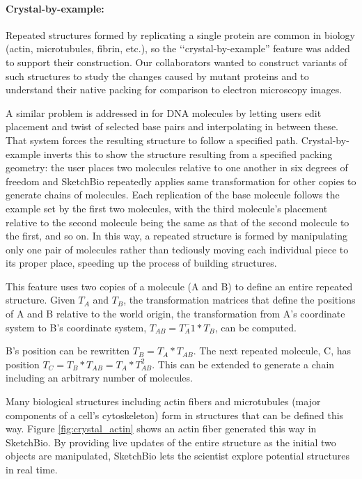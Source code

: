 \documentclass[twocolumn]{bmcart}%
\begin{document}
\paragraph*{Crystal-by-example:}
Repeated structures formed by replicating a single protein are common in biology (actin, microtubules, fibrin, etc.), so the `‘crystal-by-example'' feature was added to support their construction.
Our collaborators wanted to construct variants of such structures to study the changes caused by mutant proteins and to understand their native packing for comparison to electron microscopy images.

A similar problem is addressed in \cite{hornus2013easy} for DNA molecules by letting users edit placement and twist of selected base pairs and interpolating in between these.  That system forces the resulting structure to follow a specified path.
Crystal-by-example inverts this to show the structure resulting from a specified packing geometry: the user places two molecules relative to one another in six degrees of freedom and SketchBio repeatedly applies same transformation for other copies to generate chains of molecules.
Each replication of the base molecule follows the example set by the first two molecules, with the third molecule's placement relative to the second molecule being the same as that of the second molecule to the first, and so on.
In this way, a repeated structure is formed by manipulating only one pair of molecules rather than tediously moving each individual piece to its proper place, speeding up the process of building structures.

This feature uses two copies of a molecule (A and B) to define an entire repeated structure.
Given $T_A$ and $T_B$, the transformation matrices that define the positions of A and B relative to the world origin, the transformation from A's coordinate system to B's coordinate system, $T_{AB} = T_A^-1*T_B$, can be computed.

B's position can be rewritten $T_B = T_A*T_{AB}$.  The next repeated molecule, C, has position $T_C = T_B*T_{AB} = T_A*T_{AB}^2$.
This can be extended to generate a chain including an arbitrary number of molecules.

Many biological structures including actin fibers and microtubules (major components of a cell's cytoskeleton) form in structures that can be defined this way.
Figure \ref{fig:crystal_actin} shows an actin fiber generated this way in SketchBio.
By providing live updates of the entire structure as the initial two objects are manipulated, SketchBio lets the scientist explore potential structures in real time.
\end{document}
